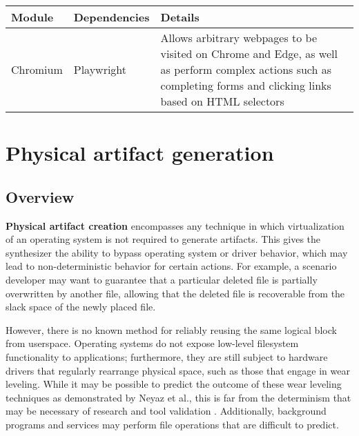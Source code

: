 \documentclass[letterpaper,12pt]{report}
\begin{document}
\begin{longtable}[]{@{}
  >{\raggedright\arraybackslash}p{}
  >{\raggedright\arraybackslash}p{}
  >{\raggedright\arraybackslash}p{}@{}}
\toprule\noalign{}
\begin{minipage}[b]{\linewidth}\raggedright
Module
\end{minipage} & \begin{minipage}[b]{\linewidth}\raggedright
Dependencies
\end{minipage} & \begin{minipage}[b]{\linewidth}\raggedright
Details
\end{minipage} \\
\midrule\noalign{}
\endhead
\bottomrule\noalign{}
\endlastfoot
Chromium & Playwright \cite{MicrosoftPlaywrightpython2025} & Allows
arbitrary webpages to be visited on Chrome and Edge, as well as perform
complex actions such as completing forms and clicking links based on
HTML selectors \\
\end{longtable}

\section{Physical artifact
generation}\label{physical-artifact-generation}

\subsection{Overview}\label{overview-1}

\textbf{Physical artifact creation} encompasses any technique in which
virtualization of an operating system is not required to generate
artifacts. This gives the synthesizer the ability to bypass operating
system or driver behavior, which may lead to non-deterministic behavior
for certain actions. For example, a scenario developer may want to
guarantee that a particular deleted file is partially overwritten by
another file, allowing that the deleted file is recoverable from the
slack space of the newly placed file.

However, there is no known method for reliably reusing the same logical
block from userspace. Operating systems do not expose low-level
filesystem functionality to applications; furthermore, they are still
subject to hardware drivers that regularly rearrange physical space,
such as those that engage in wear leveling. While it may be possible to
predict the outcome of these wear leveling techniques as demonstrated by
Neyaz et al., this is far from the determinism that may be necessary of
research and tool validation \cite{neyazForensicAnalysisWear2018}.
Additionally, background programs and services may perform file
operations that are difficult to predict.
\end{document}

